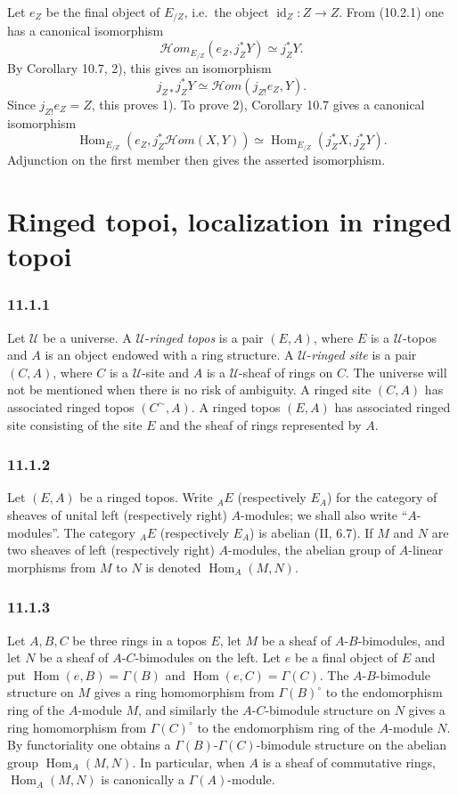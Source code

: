 \documentclass[11pt]{article}
\newcommand{\U}{\mathcal{U}}
\newcommand{\Hom}{\operatorname{Hom}}
\newcommand{\id}{\operatorname{id}}
\newcommand{\scrHom}{\mathscr{H}\!om}
\newcommand{\ie}{i.e.}
\begin{document}
Let $e_Z$ be the final object of $E_{/Z}$, \ie\ the object $\id_Z:Z\to Z$. From (10.2.1) one has a canonical isomorphism
\[
\scrHom_{E_{/Z}}(e_Z,j_Z^*Y)\simeq j_Z^*Y.
\]
By Corollary 10.7, 2), this gives an isomorphism
\[
j_{Z*}j_Z^*Y\simeq \scrHom(j_{Z!}e_Z,Y).
\]
Since $j_{Z!}e_Z=Z$, this proves 1). To prove 2), Corollary 10.7 gives a canonical isomorphism
\[
\Hom_{E_{/Z}}(e_Z,j_Z^*\scrHom(X,Y))\simeq
\Hom_{E_{/Z}}(j_Z^*X,j_Z^*Y).
\]
Adjunction on the first member then gives the asserted isomorphism.

\section{Ringed topoi, localization in ringed topoi}

\subsubsection*{11.1.1}
Let $\U$ be a universe. A $\U$-\emph{ringed topos} is a pair $(E,A)$, where $E$ is a $\U$-topos and $A$ is an object endowed with a ring structure. A $\U$-\emph{ringed site} is a pair $(C,A)$, where $C$ is a $\U$-site and $A$ is a $\U$-sheaf of rings on $C$. The universe will not be mentioned when there is no risk of ambiguity. A ringed site $(C,A)$ has associated ringed topos $(C^{\sim},A)$. A ringed topos $(E,A)$ has associated ringed site consisting of the site $E$ and the sheaf of rings represented by $A$.

\subsubsection*{11.1.2}
Let $(E,A)$ be a ringed topos. Write ${}_AE$ (respectively $E_A$) for the category of sheaves of unital left (respectively right) $A$-modules; we shall also write ``$A$-modules''. The category ${}_AE$ (respectively $E_A$) is abelian (II, 6.7). If $M$ and $N$ are two sheaves of left (respectively right) $A$-modules, the abelian group of $A$-linear morphisms from $M$ to $N$ is denoted $\Hom_A(M,N)$.

\subsubsection*{11.1.3}
Let $A,B,C$ be three rings in a topos $E$, let $M$ be a sheaf of $A$-$B$-bimodules, and let $N$ be a sheaf of $A$-$C$-bimodules on the left. Let $e$ be a final object of $E$ and put $\Hom(e,B)=\Gamma(B)$ and $\Hom(e,C)=\Gamma(C)$. The $A$-$B$-bimodule structure on $M$ gives a ring homomorphism from $\Gamma(B)^{\circ}$ to the endomorphism ring of the $A$-module $M$, and similarly the $A$-$C$-bimodule structure on $N$ gives a ring homomorphism from $\Gamma(C)^{\circ}$ to the endomorphism ring of the $A$-module $N$. By functoriality one obtains a $\Gamma(B)$-$\Gamma(C)$-bimodule structure on the abelian group $\Hom_A(M,N)$. In particular, when $A$ is a sheaf of commutative rings, $\Hom_A(M,N)$ is canonically a $\Gamma(A)$-module.
\end{document}
